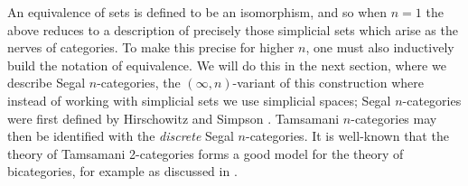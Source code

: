 \documentclass[a4paper]{amsart}
\begin{document}
\noindent An equivalence of sets is defined to be an isomorphism, and so when $n=1$ the above reduces to a description of precisely those simplicial sets which arise as the nerves of categories. To make this precise for higher $n$, one must also inductively build the notation of equivalence. We will do this in the next section, where we describe Segal $n$-categories, the $(\infty,n)$-variant of this construction where instead of working with simplicial sets we use simplicial spaces; Segal $n$-categories were first defined by Hirschowitz and Simpson \cite{9807049}. Tamsamani $n$-categories may then be identified with the {\em discrete} Segal $n$-categories.  It is well-known that the theory of Tamsamani 2-categories forms a good model for the theory of bicategories, for example as discussed in \cite{MR2366560}.




\end{document}
